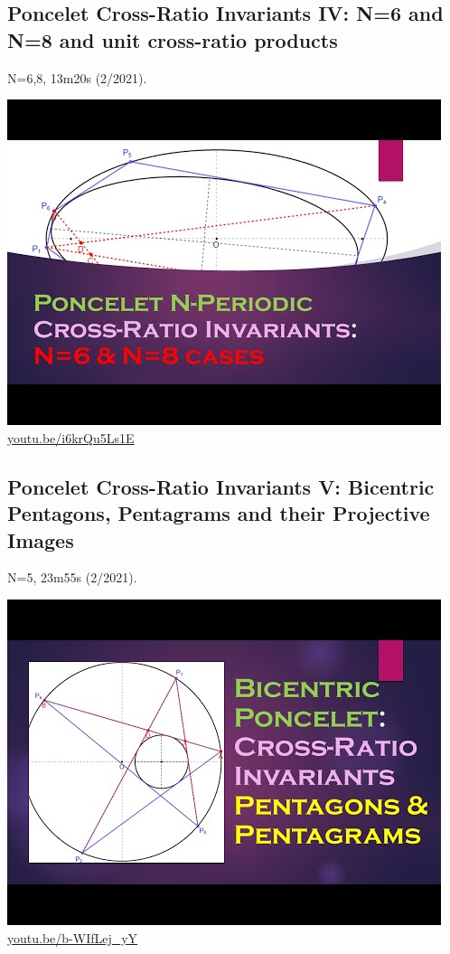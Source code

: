 \documentclass[12pt]{amsart}
\begin{document}
\subsection{Poncelet Cross-Ratio Invariants IV: N=6 and N=8 and unit cross-ratio products}
\label{vid:i6krQu5Ls1E}
\noindent N=6,8, 13m20s (2/2021). 
\begin{center}\includegraphics[width=.5\textwidth]{pics/i6krQu5Ls1E.jpg} \\ 
\href{https://youtu.be/i6krQu5Ls1E}{\url{youtu.be/i6krQu5Ls1E}}\end{center}
% 

\subsection{Poncelet Cross-Ratio Invariants V: Bicentric Pentagons, Pentagrams and their Projective Images}
\label{vid:b-WIfLej_yY}
\noindent N=5, 23m55s (2/2021). 
\begin{center}\includegraphics[width=.5\textwidth]{pics/b-WIfLej_yY.jpg} \\ 
\href{https://youtu.be/b-WIfLej_yY}{\url{youtu.be/b-WIfLej\_yY}}\end{center}
% 
\end{document}
